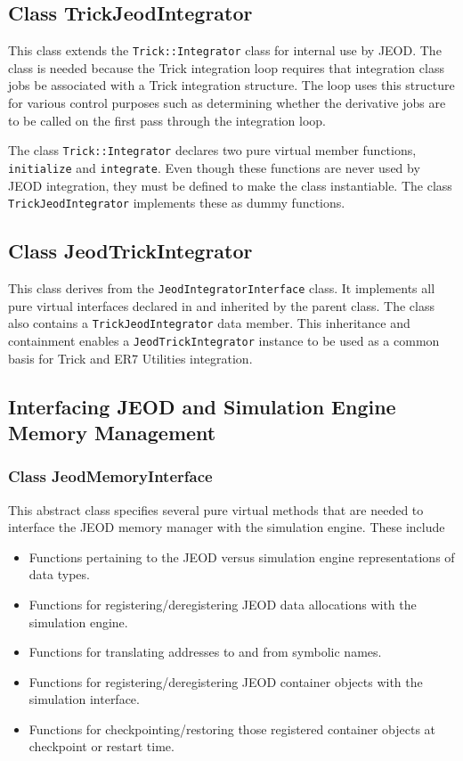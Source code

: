 \subsection{Class TrickJeodIntegrator}
This class extends the \verb|Trick::Integrator| class for internal use by
JEOD. The class is needed because the Trick integration loop requires that
integration class jobs be associated with a Trick integration structure.
The loop uses this structure for various control purposes such as
determining whether the derivative jobs are to be called on the first
pass through the integration loop. 

The class \verb|Trick::Integrator| declares two pure virtual member
functions, \verb|initialize| and \verb|integrate|.
Even though these functions are never used by JEOD integration, they
must be defined to make the class instantiable.
The class \verb|TrickJeodIntegrator| implements these as dummy functions.

\subsection{Class JeodTrickIntegrator}
This class derives from the \verb|JeodIntegratorInterface| class.
It implements all pure virtual interfaces declared in and inherited by
the parent class.
The class also contains a \verb|TrickJeodIntegrator| data member.
This inheritance and containment enables a \verb|JeodTrickIntegrator| instance
to be used as a common basis for Trick and ER7 Utilities integration.

\subsection{Interfacing JEOD and Simulation Engine Memory Management}
\subsubsection{Class JeodMemoryInterface}
This abstract class specifies several pure virtual methods that are needed to
interface the JEOD memory manager with the simulation engine. These include
\begin{itemize}
\item Functions pertaining to the JEOD versus simulation engine
representations of data types.
\item Functions for registering/deregistering JEOD data allocations
with the simulation engine.
\item Functions for translating addresses to and from symbolic names.
\item Functions for registering/deregistering JEOD container objects
with the simulation interface.
\item Functions for checkpointing/restoring those registered  container objects
at checkpoint or restart time.
\end{itemize}

